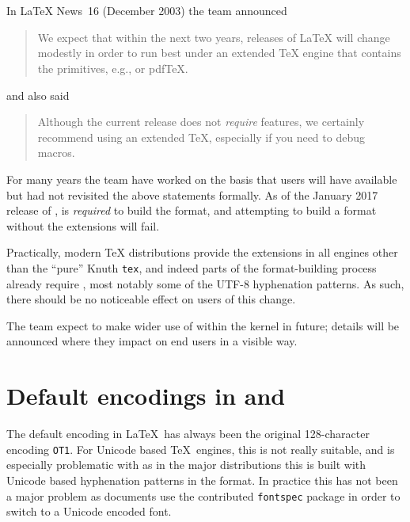 \documentclass{ltnews}
\providecommand\pkg[1]{\texttt{#1}}
\begin{document}
\maketitle
\tableofcontents

\setlength{}
\section{\eTeX{}}

In \LaTeX{} News~16 (December 2003) the team announced
\begin{quotation}
We expect that within the next two years, releases of \LaTeX{} will
change modestly in order to run best under an extended \TeX{} engine
that contains the \eTeX{} primitives, e.g., \eTeX{} or pdf\TeX{}.
\end{quotation}
and also said
\begin{quotation}
Although the current release does not \emph{require} \eTeX{} features, we
certainly recommend using an extended \TeX{}, especially if you need to debug
macros.
\end{quotation}

For many years the team have worked on the basis that users will have \eTeX{}
available but had not revisited the above statements formally. As of the
January 2017 release of \LaTeXe{}, \eTeX{} is \emph{required} to build the
format, and attempting to build a format without the extensions will fail.

Practically, modern \TeX{} distributions provide the extensions in all engines
other than the ``pure'' Knuth \texttt{tex}, and indeed parts of the
format-building process already require \eTeX{}, most notably some of the UTF-8
hyphenation patterns. As such, there should be no noticeable effect on users of
this change.

The team expect to make wider use of \eTeX{} within the kernel in future;
details will be announced where they impact on end users in a visible way.

\section{Default encodings in  and }
The default encoding in \LaTeX\ has always been the original
128-character encoding \texttt{OT1}.  For Unicode based \TeX\ engines, this
is not really suitable, and is especially problematic with
 as in the major distributions this is built with
Unicode based hyphenation patterns in the format.  In practice this has
not been a major problem as documents use the contributed
\pkg{fontspec} package in order to switch to a
Unicode encoded font.
\end{document}
